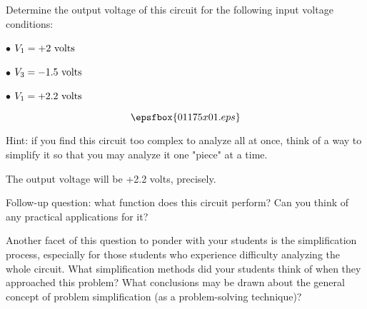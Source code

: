 

Determine the output voltage of this circuit for the following input voltage conditions:

\medskip
\item{$\bullet$} $V_1 = +2 \hbox{ volts}$
\item{$\bullet$} $V_3 = -1.5 \hbox{ volts}$
\item{$\bullet$} $V_1 = +2.2 \hbox{ volts}$
\medskip

$$\epsfbox{01175x01.eps}$$

\vskip 10pt

Hint: if you find this circuit too complex to analyze all at once, think of a way to simplify it so that you may analyze it one "piece" at a time.







The output voltage will be +2.2 volts, precisely.

\vskip 10pt

Follow-up question: what function does this circuit perform?  Can you think of any practical applications for it?







Another facet of this question to ponder with your students is the simplification process, especially for those students who experience difficulty analyzing the whole circuit.  What simplification methods did your students think of when they approached this problem?  What conclusions may be drawn about the general concept of problem simplification (as a problem-solving technique)?




